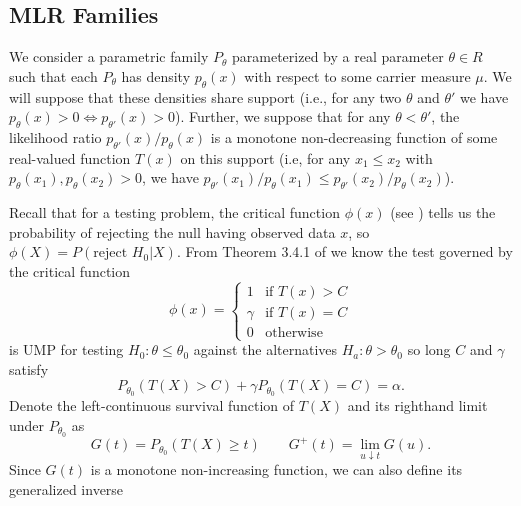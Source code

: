 \documentclass{article}
\begin{document}
\begin{appendix}
\subsection{MLR Families}
\label{sec:one_sided_mlr_appdx}

We consider a parametric family $P_{\theta}$ parameterized by a real parameter $\theta \in R$ such that each $P_{\theta}$ has density $p_{\theta}(x)$ with respect to some carrier measure $\mu$. We will suppose that these densities share support (i.e., for any two $\theta$ and $\theta'$ we have $p_{\theta}(x) > 0 \iff p_{\theta'}(x)> 0$). Further, we suppose that for any $\theta < \theta'$, the likelihood ratio $p_{\theta'}(x)/p_{\theta}(x)$ is a monotone non-decreasing function of some real-valued function $T(x)$ on this support (i.e, for any $x_1 \leq x_2$ with $p_{\theta}(x_1), p_{\theta}(x_2) > 0$, we have $p_{\theta'}(x_1)/p_{\theta}(x_1) \leq p_{\theta'}(x_2)/p_{\theta}(x_2)$). 


Recall that for a testing problem, the critical function $\phi(x)$ (see \cite[Section 3.1]{Lehmann}) tells us the probability of rejecting the null having observed data $x$, so $\phi(X) = P(\text{reject } H_0 | X)$. From Theorem 3.4.1 of \cite{Lehmann} we know the test governed by the critical function 
\begin{equation}
    \label{eq:mlr_test}
    \phi(x) = \begin{cases}
        1 &\text{if } T(x) > C  \\
        \gamma &\text{if } T(x) = C  \\
        0 & \text{otherwise }
    \end{cases}
\end{equation}
is UMP for testing $H_0 : \theta \leq \theta_0$ against the alternatives $H_a : \theta > \theta_0 $ so long $C$ and $\gamma$ satisfy
\begin{equation}
    \label{eq:constraint}
    P_{\theta_0}(T(X) > C) + \gamma P_{\theta_0}(T(X) = C) = \alpha.
\end{equation}
Denote the left-continuous survival function of $T(X)$ and its righthand limit under $P_{\theta_0}$ as
\begin{equation*}
    G(t) = P_{\theta_0}(T(X) \geq t) \qquad G^+(t) = \lim_{u \downarrow t} G(u).
\end{equation*}
Since $G(t)$ is a monotone non-increasing function, we can also define its generalized inverse 


\end{appendix}
\end{document}
